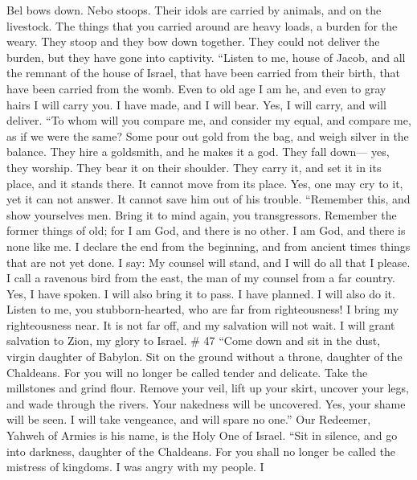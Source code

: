  Bel bows down. Nebo stoops. Their idols are carried by
animals, and on the livestock. The things that you carried around are
heavy loads, a burden for the weary.  They stoop and they
bow down together. They could not deliver the burden, but they have gone
into captivity.  ``Listen to me, house of Jacob, and all
the remnant of the house of Israel, that have been carried from their
birth, that have been carried from the womb.  Even to old
age I am he, and even to gray hairs I will carry you. I have made, and I
will bear. Yes, I will carry, and will deliver.  ``To whom
will you compare me, and consider my equal, and compare me, as if we
were the same?  Some pour out gold from the bag, and weigh
silver in the balance. They hire a goldsmith, and he makes it a god.
They fall down--- yes, they worship.  They bear it on
their shoulder. They carry it, and set it in its place, and it stands
there. It cannot move from its place. Yes, one may cry to it, yet it can
not answer. It cannot save him out of his trouble. 
``Remember this, and show yourselves men. Bring it to mind again, you
transgressors.  Remember the former things of old; for I
am God, and there is no other. I am God, and there is none like me.
 I declare the end from the beginning, and from ancient
times things that are not yet done. I say: My counsel will stand, and I
will do all that I please.  I call a ravenous bird from
the east, the man of my counsel from a far country. Yes, I have spoken.
I will also bring it to pass. I have planned. I will also do it.
 Listen to me, you stubborn-hearted, who are far from
righteousness!  I bring my righteousness near. It is not
far off, and my salvation will not wait. I will grant salvation to Zion,
my glory to Israel. \# 47  ``Come down and sit in the
dust, virgin daughter of Babylon. Sit on the ground without a throne,
daughter of the Chaldeans. For you will no longer be called tender and
delicate.  Take the millstones and grind flour. Remove
your veil, lift up your skirt, uncover your legs, and wade through the
rivers.  Your nakedness will be uncovered. Yes, your shame
will be seen. I will take vengeance, and will spare no one.''
 Our Redeemer, Yahweh of Armies is his name, is the Holy
One of Israel.  ``Sit in silence, and go into darkness,
daughter of the Chaldeans. For you shall no longer be called the
mistress of kingdoms.  I was angry with my people. I
